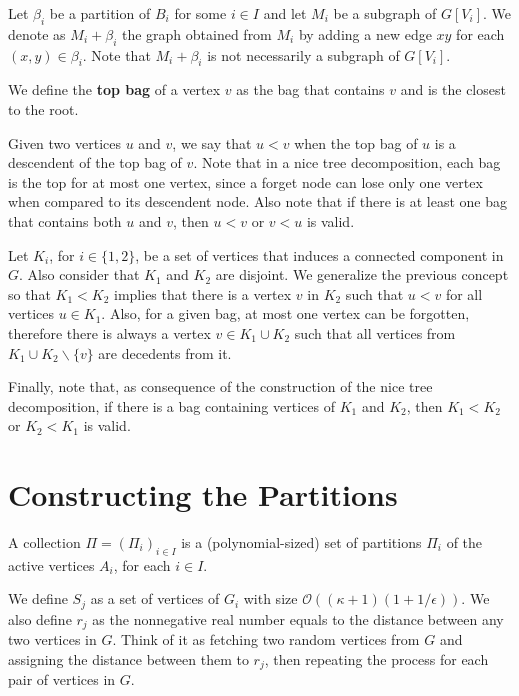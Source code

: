 Let \(\beta_i\) be a partition of \(B_i\) for some \(i \in I\) and let \(M_i\) be a subgraph of \( G[V_i]\). We denote as \(M_i + \beta_i\) the graph obtained from $M_i$ by adding a new edge \(xy\) for each \((x, y) \in \beta_i\). Note that \(M_i + \beta_i\) is not necessarily a subgraph of \(G[V_i]\).

We define the \textbf{top bag} of a vertex \(v\) as the bag that contains \(v\) and is the closest to the root.

Given two vertices \(u\) and \(v\), we say that \(u < v\) when the top bag of \(u\) is a descendent of the top bag of \(v\). Note that in a nice tree decomposition, each bag is the top for at most one vertex, since a forget node can lose only one vertex when compared to its descendent node. Also note that if there is at least one bag that contains both \(u\) and \(v\), then \(u < v\) or \(v < u\) is valid.

Let \(K_i\), for \(i \in \{1, 2\}\), be a set of vertices that induces a connected component in \(G\). Also consider that \(K_1\) and \(K_2\) are disjoint. We generalize the previous concept so that \(K_1 < K_2\) implies that there is a vertex \(v\) in \(K_2\) such that \(u < v\) for all vertices \(u \in K_1\). Also, for a given bag, at most one vertex can be forgotten, therefore there is always a vertex \(v \in K_1 \cup K_2\) such that all vertices from \(K_1 \cup K_2 \backslash \{v\}\) are decedents from it.

Finally, note that, as consequence of the construction of the nice tree decomposition, if there is a bag containing vertices of \(K_1\) and \(K_2\), then \(K_1 < K_2\) or \(K_2 < K_1\) is valid.

\section{Constructing the Partitions}


A collection \(\Pi = (\Pi_i)_{i \in I}\) is a (polynomial-sized) set of partitions \(\Pi_i\) of the active vertices \(A_i\), for each \(i \in I\).

We define \(S_j\) as a set of vertices of \(G_i\) with size \(\mathcal{O}((\kappa + 1)(1 + 1/\epsilon))\). We also define \(r_j\) as the nonnegative real number equals to the distance between any two vertices in \(G\). Think of it as fetching two random vertices from \(G\) and assigning the distance between them to \(r_j\), then repeating the process for each pair of vertices in \(G\).

